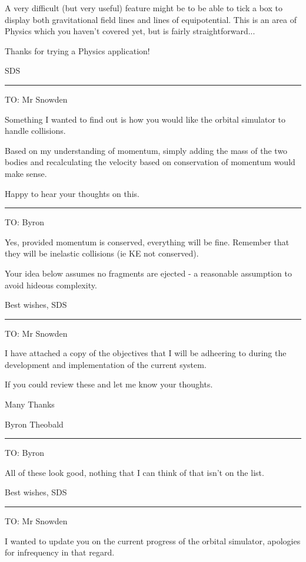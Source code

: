 {A very difficult (but very useful) feature might be to be able to tick a box to display both gravitational field lines and lines of equipotential. This is an area of Physics which you haven’t covered yet, but is fairly straightforward...

Thanks for trying a Physics application!

SDS

\vspace{8pt}
\hrule

TO: Mr Snowden

Something I wanted to find out is how you would like the orbital simulator to handle collisions.

Based on my understanding of momentum, simply adding the mass of the two bodies and recalculating the velocity based on conservation of momentum would make sense.

Happy to hear your thoughts on this.

\vspace{8pt}
\hrule

TO: Byron

Yes, provided momentum is conserved, everything will be fine. Remember that they will be 
inelastic collisions (ie KE not conserved).

Your idea below assumes no fragments are ejected - a reasonable assumption to avoid hideous complexity.

Best wishes,
SDS

\vspace{8pt}
\hrule

TO: Mr Snowden

I have attached a copy of the objectives that I will be adheering to during the development and implementation of the current system.

If you could review these and let me know your thoughts.

Many Thanks

Byron Theobald

\vspace{8pt}
\hrule

TO: Byron

All of these look good, nothing that I can think of that isn't on the list.

Best wishes,
SDS

\vspace{8pt}
\hrule

TO: Mr Snowden

I wanted to update you on the current progress of the orbital simulator, apologies for infrequency in that regard.

}

